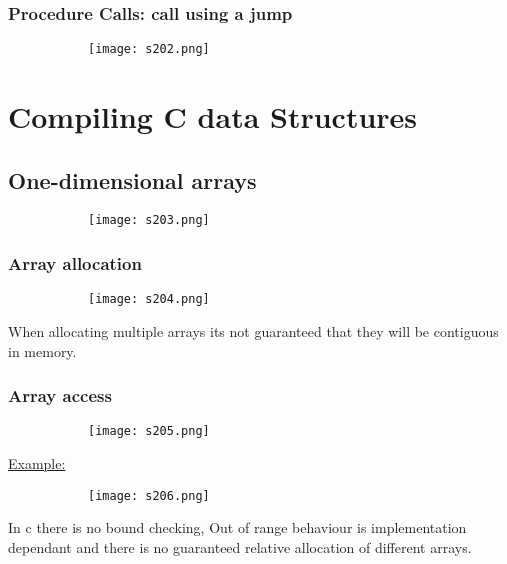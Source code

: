 \documentclass[8pt]{extreport}
\begin{document}
\subsection{Procedure Calls: call using a jump}
\begin{figure}[H]
\centering
\begin{subfigure}[b]{0.4\linewidth}
\texttt{[image: s202.png]}
\end{subfigure}
\end{figure}


\chapter{Compiling C data Structures}

\section{One-dimensional arrays}
\begin{figure}[H]
\centering
\begin{subfigure}[b]{0.4\linewidth}
\texttt{[image: s203.png]}
\end{subfigure}
\end{figure}

\subsection{Array allocation}
\begin{figure}[H]
\centering
\begin{subfigure}[b]{0.4\linewidth}
\texttt{[image: s204.png]}
\end{subfigure}
\end{figure}
When allocating multiple arrays its not guaranteed that they will be contiguous in memory.
\subsection{Array access}
\begin{figure}[H]
\centering
\begin{subfigure}[b]{0.4\linewidth}
\texttt{[image: s205.png]}
\end{subfigure}
\end{figure}
\underline{Example:}
\begin{figure}[H]
\centering
\begin{subfigure}[b]{0.4\linewidth}
\texttt{[image: s206.png]}
\end{subfigure}
\end{figure}
In c there is no bound checking, Out of range behaviour is implementation dependant and there is no guaranteed relative allocation of different arrays.
\end{document}
